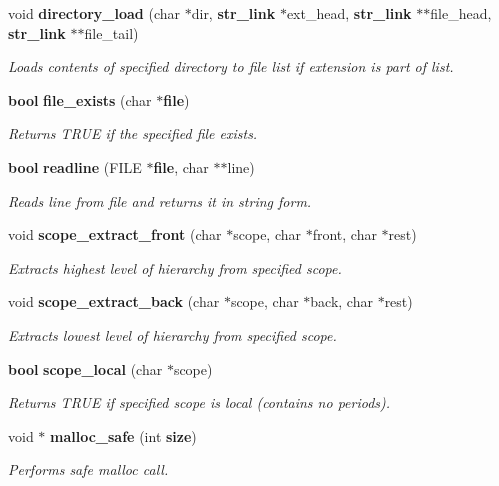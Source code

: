 \begin{CompactItemize}
void {\bf directory\_\-load} (char $\ast$dir, {\bf str\_\-link} $\ast$ext\_\-head, {\bf str\_\-link} $\ast$$\ast$file\_\-head, {\bf str\_\-link} $\ast$$\ast$file\_\-tail)
\begin{CompactList}\small\item\em Loads contents of specified directory to file list if extension is part of list.\item\end{CompactList}\item 
{\bf bool} {\bf file\_\-exists} (char $\ast${\bf file})
\begin{CompactList}\small\item\em Returns TRUE if the specified file exists.\item\end{CompactList}\item 
{\bf bool} {\bf readline} (FILE $\ast${\bf file}, char $\ast$$\ast$line)
\begin{CompactList}\small\item\em Reads line from file and returns it in string form.\item\end{CompactList}\item 
void {\bf scope\_\-extract\_\-front} (char $\ast$scope, char $\ast$front, char $\ast$rest)
\begin{CompactList}\small\item\em Extracts highest level of hierarchy from specified scope.\item\end{CompactList}\item 
void {\bf scope\_\-extract\_\-back} (char $\ast$scope, char $\ast$back, char $\ast$rest)
\begin{CompactList}\small\item\em Extracts lowest level of hierarchy from specified scope.\item\end{CompactList}\item 
{\bf bool} {\bf scope\_\-local} (char $\ast$scope)
\begin{CompactList}\small\item\em Returns TRUE if specified scope is local (contains no periods).\item\end{CompactList}\item 
void $\ast$ {\bf malloc\_\-safe} (int {\bf size})
\begin{CompactList}\small\item\em Performs safe malloc call.\item\end{CompactList}\item 
$$
\end{CompactItemize}
